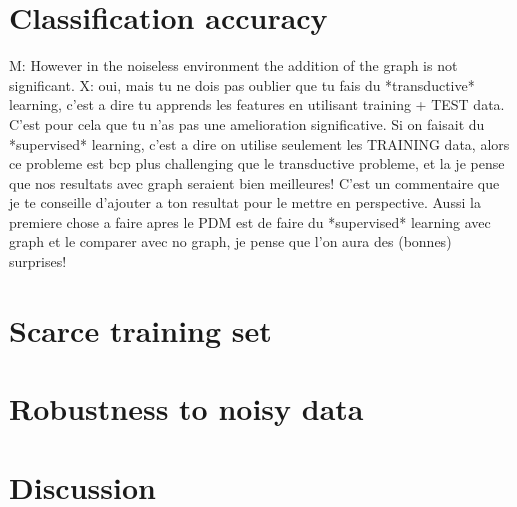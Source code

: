 \section{Classification accuracy}

M: However in the noiseless environment the addition of the graph is not significant.
X: oui, mais tu ne dois pas oublier que tu fais du *transductive* learning, c'est a dire tu apprends les features en utilisant training + TEST data. C'est pour cela que tu n'as pas une amelioration significative. Si on faisait du *supervised* learning, c'est a dire on utilise seulement les TRAINING data, alors ce probleme est bcp plus challenging que le transductive probleme, et la je pense que nos resultats avec graph seraient bien meilleures! C'est un commentaire que je te conseille d'ajouter a ton resultat pour le mettre en perspective. Aussi la premiere chose a faire apres le PDM est de faire du *supervised* learning avec graph et le comparer avec no graph, je pense que l'on aura des (bonnes) surprises!


\section{Scarce training set}

\section{Robustness to noisy data}

\section{Discussion}


